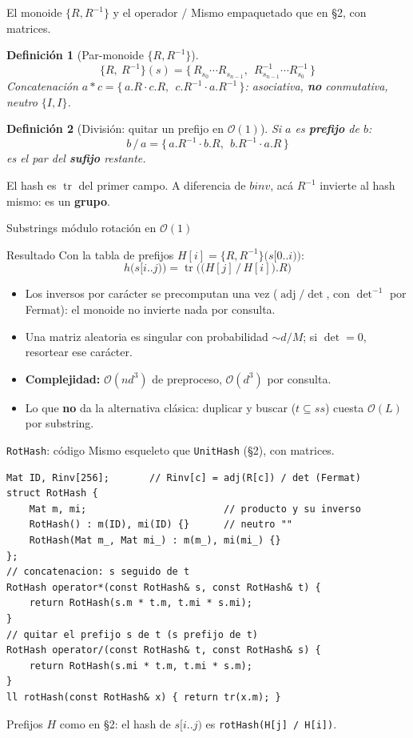 \documentclass{beamer}
\newtheorem{definicion}{Definición}
\begin{document}
\begin{frame}{El monoide $\{R, R^{-1}\}$ y el operador $/$}
Mismo empaquetado que en \S2, con matrices.
\begin{definicion}[Par-monoide $\{R, R^{-1}\}$]
\[
\{R,\ R^{-1}\}(s) = \{\, R_{s_0}\cdots R_{s_{n-1}},\ \ R_{s_{n-1}}^{-1}\cdots R_{s_0}^{-1} \,\}
\]
Concatenación $a * c = \{\, a.R\cdot c.R,\ \ c.R^{-1}\cdot a.R^{-1} \,\}$: asociativa, \textbf{no} conmutativa, neutro $\{I, I\}$.
\end{definicion}
\pause
\begin{definicion}[División: quitar un prefijo en $\mathcal{O}(1)$]
Si $a$ es \textbf{prefijo} de $b$:
\[
b \,/\, a = \{\, a.R^{-1}\cdot b.R,\ \ b.R^{-1}\cdot a.R \,\}
\]
es el par del \textbf{sufijo} restante.
\end{definicion}
El hash es $\operatorname{tr}$ del primer campo. A diferencia de $binv$, acá $R^{-1}$ invierte al hash mismo: es un \textbf{grupo}.
\end{frame}

\begin{frame}{Substrings módulo rotación en $\mathcal{O}(1)$}
\begin{block}{Resultado}
Con la tabla de prefijos $H[i] = \{R,R^{-1}\}\big(s[0..i)\big)$:
\[
h\big(s[i..j)\big) = \operatorname{tr}\Big( \big(H[j] \,/\, H[i]\big).R \Big)
\]
\end{block}
\begin{itemize}
    \item Los inversos por carácter se precomputan una vez ($\operatorname{adj}/\det$, con $\det^{-1}$ por Fermat): el monoide no invierte nada por consulta.
    \item Una matriz aleatoria es singular con probabilidad $\sim d/M$; si $\det = 0$, resortear ese carácter.
    \item \textbf{Complejidad:} $\mathcal{O}(n d^3)$ de preproceso, $\mathcal{O}(d^3)$ por consulta.
    \item Lo que \textbf{no} da la alternativa clásica: duplicar y buscar ($t \subseteq ss$) cuesta $\mathcal{O}(L)$ por substring.
\end{itemize}
\end{frame}

\begin{frame}[fragile]{\texttt{RotHash}: código}
Mismo esqueleto que \texttt{UnitHash} (\S2), con matrices.
{\scriptsize
\begin{verbatim}
Mat ID, Rinv[256];       // Rinv[c] = adj(R[c]) / det (Fermat)
struct RotHash {
    Mat m, mi;                        // producto y su inverso
    RotHash() : m(ID), mi(ID) {}      // neutro ""
    RotHash(Mat m_, Mat mi_) : m(m_), mi(mi_) {}
};
// concatenacion: s seguido de t
RotHash operator*(const RotHash& s, const RotHash& t) {
    return RotHash(s.m * t.m, t.mi * s.mi);
}
// quitar el prefijo s de t (s prefijo de t)
RotHash operator/(const RotHash& t, const RotHash& s) {
    return RotHash(s.mi * t.m, t.mi * s.m);
}
ll rotHash(const RotHash& x) { return tr(x.m); }
\end{verbatim}
}
Prefijos $H$ como en \S2: el hash de $s[i..j)$ es \verb|rotHash(H[j] / H[i])|.
\end{frame}
\end{document}
